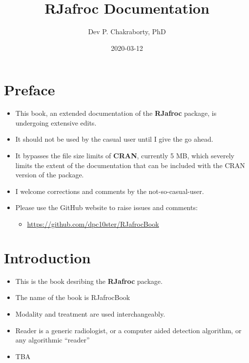 \documentclass[]{book}
\title{RJafroc Documentation}
\author{Dev P. Chakraborty, PhD}
\date{2020-03-12}
\providecommand{\tightlist}{%
  \setlength{\itemsep}{0pt}\setlength{\parskip}{0pt}}
\begin{document}
\maketitle

{
\setcounter{tocdepth}{1}
\tableofcontents
}
\hypertarget{preface}{%
\chapter*{Preface}\label{preface}}

\begin{itemize}
\tightlist
\item
  This book, an extended documentation of the \textbf{RJafroc} package, is undergoing extensive edits.
\item
  It should not be used by the casual user until I give the go ahead.
\item
  It bypasses the file size limits of \textbf{CRAN}, currently 5 MB, which severely limits the extent of the documentation that can be included with the CRAN version of the package.
\item
  I welcome corrections and comments by the not-so-casual-user.
\item
  Please use the GitHub website to raise issues and comments:

  \begin{itemize}
  \tightlist
  \item
    \url{https://github.com/dpc10ster/RJafrocBook}
  \end{itemize}
\end{itemize}

\hypertarget{intro}{%
\chapter{Introduction}\label{intro}}

\begin{itemize}
\tightlist
\item
  This is the book desribing the \textbf{RJafroc} package.
\item
  The name of the book is RJafrocBook
\item
  Modality and treatment are used interchangeably.
\item
  Reader is a generic radiologist, or a computer aided detection algorithm, or any algorithmic ``reader''
\item
  TBA
\end{itemize}
\end{document}
